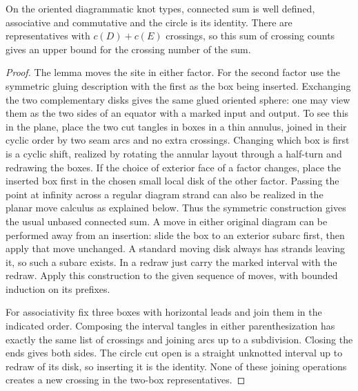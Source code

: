 \begin{theorem}
On the oriented diagrammatic knot types, connected sum is well defined, associative and commutative and the circle is its identity. There are representatives with $c(D)+c(E)$ crossings, so this sum of crossing counts gives an upper bound for the crossing number of the sum.
\end{theorem}
\begin{proof}
The lemma moves the site in either factor. For the second factor use the symmetric gluing description with the first as the box being inserted. Exchanging the two complementary disks gives the same glued oriented sphere: one may view them as the two sides of an equator with a marked input and output. To see this in the plane, place the two cut tangles in boxes in a thin annulus, joined in their cyclic order by two seam arcs and no extra crossings. Changing which box is first is a cyclic shift, realized by rotating the annular layout through a half-turn and redrawing the boxes. If the choice of exterior face of a factor changes, place the inserted box first in the chosen small local disk of the other factor. Passing the point at infinity across a regular diagram strand can also be realized in the planar move calculus as explained below. Thus the symmetric construction gives the usual unbased connected sum. A move in either original diagram can be performed away from an insertion: slide the box to an exterior subarc first, then apply that move unchanged. A standard moving disk always has strands leaving it, so such a subarc exists. In a redraw just carry the marked interval with the redraw. Apply this construction to the given sequence of moves, with bounded induction on its prefixes.

For associativity fix three boxes with horizontal leads and join them in the indicated order. Composing the interval tangles in either parenthesization has exactly the same list of crossings and joining arcs up to a subdivision. Closing the ends gives both sides. The circle cut open is a straight unknotted interval up to redraw of its disk, so inserting it is the identity. None of these joining operations creates a new crossing in the two-box representatives.
\end{proof}

